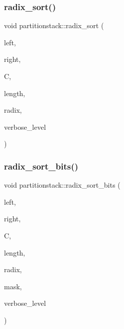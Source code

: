 \subsubsection{\texorpdfstring{radix\+\_\+sort()}{radix\_sort()}}
{\footnotesize\ttfamily void partitionstack\+::radix\+\_\+sort (\begin{DoxyParamCaption}\item[{\mbox{\hyperlink{galois_8h_a09fddde158a3a20bd2dcadb609de11dc}{I\+NT}}}]{left,  }\item[{\mbox{\hyperlink{galois_8h_a09fddde158a3a20bd2dcadb609de11dc}{I\+NT}}}]{right,  }\item[{\mbox{\hyperlink{galois_8h_a09fddde158a3a20bd2dcadb609de11dc}{I\+NT}} $\ast$}]{C,  }\item[{\mbox{\hyperlink{galois_8h_a09fddde158a3a20bd2dcadb609de11dc}{I\+NT}}}]{length,  }\item[{\mbox{\hyperlink{galois_8h_a09fddde158a3a20bd2dcadb609de11dc}{I\+NT}}}]{radix,  }\item[{\mbox{\hyperlink{galois_8h_a09fddde158a3a20bd2dcadb609de11dc}{I\+NT}}}]{verbose\+\_\+level }\end{DoxyParamCaption})}

\mbox{\label{classpartitionstack_a378eaab913db223d678a086f372ad81d}} 
\subsubsection{\texorpdfstring{radix\+\_\+sort\+\_\+bits()}{radix\_sort\_bits()}}
{\footnotesize\ttfamily void partitionstack\+::radix\+\_\+sort\+\_\+bits (\begin{DoxyParamCaption}\item[{\mbox{\hyperlink{galois_8h_a09fddde158a3a20bd2dcadb609de11dc}{I\+NT}}}]{left,  }\item[{\mbox{\hyperlink{galois_8h_a09fddde158a3a20bd2dcadb609de11dc}{I\+NT}}}]{right,  }\item[{\mbox{\hyperlink{galois_8h_a09fddde158a3a20bd2dcadb609de11dc}{I\+NT}} $\ast$}]{C,  }\item[{\mbox{\hyperlink{galois_8h_a09fddde158a3a20bd2dcadb609de11dc}{I\+NT}}}]{length,  }\item[{\mbox{\hyperlink{galois_8h_a09fddde158a3a20bd2dcadb609de11dc}{I\+NT}}}]{radix,  }\item[{\mbox{\hyperlink{galois_8h_a09fddde158a3a20bd2dcadb609de11dc}{I\+NT}}}]{mask,  }\item[{\mbox{\hyperlink{galois_8h_a09fddde158a3a20bd2dcadb609de11dc}{I\+NT}}}]{verbose\+\_\+level }\end{DoxyParamCaption})}

